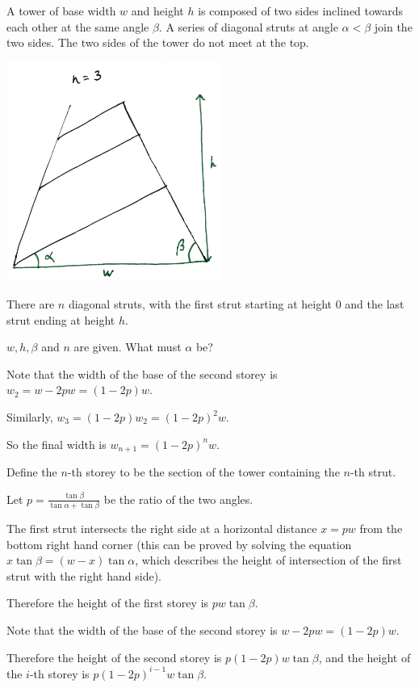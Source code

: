 \documentclass[12pt]{article}
\begin{document}
\begin{mdframed}
  A tower of base width $w$ and height $h$ is composed of two sides inclined towards each other at
  the same angle $\beta$. A series of diagonal struts at angle $\alpha < \beta$ join the two
  sides. The two sides of the tower do not meet at the top.

  \includegraphics[width=200pt]{img/puzzles-tower-struts.png}

  There are $n$ diagonal struts, with the first strut starting at height 0 and the last strut
  ending at height $h$.

  $w, h, \beta$ and $n$ are given. What must $\alpha$ be?
\end{mdframed}
Note that the width of the base of the second storey is $w_2 = w - 2pw = (1 - 2p)w$.

Similarly, $w_3 = (1 - 2p)w_2 = (1 - 2p)^2w$.

So the final width is $w_{n+1} = (1 - 2p)^nw$.


Define the $n$-th storey to be the section of the tower containing the $n$-th strut.

Let $p = \frac{\tan\beta}{\tan\alpha + \tan\beta}$ be the ratio of the two angles.

The first strut intersects the right side at a horizontal distance $x = pw$ from the bottom right
hand corner (this can be proved by solving the equation $x\tan\beta = (w - x)\tan\alpha$, which
describes the height of intersection of the first strut with the right hand side).

Therefore the height of the first storey is $pw\tan\beta$.

Note that the width of the base of the second storey is $w - 2pw = (1 - 2p)w$.

Therefore the height of the second storey is $p(1 - 2p)w\tan\beta$, and the height of the $i$-th
storey is $p(1 - 2p)^{i-1}w\tan\beta$.
\end{document}
